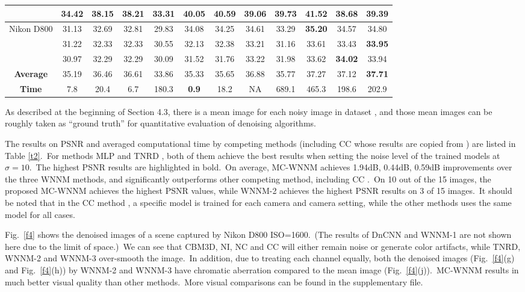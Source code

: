 \begin{table}
\begin{center}
\begin{tabular}{|c||c|c|c|c|c|c|c|c|c|c|c|}
\cline{2-12}    
& 34.42 & 38.15 & 38.21 & 33.31 & 40.05 & 40.59 & 39.06 & 39.73 & \textbf{41.52} & 38.68 & 39.39
\\ 
\hline
\multirow{3}{*}{Nikon D800} 
& 31.13 & 32.69 & 32.81 & 29.83 & 34.08 & 34.25 & 34.61 & 33.29 & \textbf{35.20} & 34.57 & 34.80
\\ 
\cline{2-12} 
\multirow{3}{*}{ISO = 6400}   
& 31.22 & 32.33 & 32.33 & 30.55 & 32.13 & 32.38  & 33.21 & 31.16 & 33.61 & 33.43 & \textbf{33.95}
\\ 
\cline{2-12}    
& 30.97 & 32.29 & 32.29 & 30.09 & 31.52 & 31.76 & 33.22 & 31.98 & 33.62 & \textbf{34.02} & 33.94
\\
\hline
\textbf{Average} 
& 35.19 & 36.46 & 36.61 & 33.86 & 35.33 & 35.65 & 36.88 & 35.77 & 37.27 & 37.12 & \textbf{ 37.71}
\\
\hline
\textbf{Time} 
& 7.8 & 20.4 & 6.7 & 180.3 & \textbf{0.9} & 18.2 & NA & 689.1 & 465.3 & 198.6 & 202.9
\\
\hline
\end{tabular}
\end{center}
\end{table}



\quad As described at the beginning of Section 4.3, there is a mean image for each noisy image in dataset \cite{crosschannel2016}, and those mean images can be roughly taken as ``ground truth'' for quantitative evaluation of denoising algorithms.

The results on PSNR and averaged computational time by competing methods (including CC \cite{crosschannel2016} whose results are copied from \cite{crosschannel2016}) are listed in Table \ref{t2}.\ For methods MLP \cite{mlp} and TNRD \cite{chen2015learning}, both of them achieve the best results when setting the noise level of the trained models at $\sigma=10$.\ The highest PSNR results are highlighted in bold.\ On average, MC-WNNM achieves 1.94dB, 0.44dB, 0.59dB improvements over the three WNNM methods, and significantly outperforms other competing method, including CC \cite{crosschannel2016}.\ On 10 out of the 15 images, the proposed MC-WNNM achieves the highest PSNR values, while WNNM-2 achieves the highest PSNR results on 3 of 15 images.\ It should be noted that in the CC method \cite{crosschannel2016}, a specific model is trained for each camera and camera setting, while the other methods uses the same model for all cases. 

Fig.\ \ref{f4} shows the denoised images of a scene captured by Nikon D800 ISO=1600.\ (The results of DnCNN and WNNM-1 are not shown here due to the limit of space.)\ We can see that CBM3D, NI, NC and CC will either remain noise or generate color artifacts, while TNRD, WNNM-2 and WNNM-3 over-smooth the image.\ In addition, due to treating each channel equally, both the denoised images (Fig.\ \ref{f4}(g) and Fig.\ \ref{f4}(h)) by WNNM-2 and WNNM-3 have chromatic aberration compared to the mean image (Fig.\ \ref{f4}(j)).\ MC-WNNM results in much better visual quality than other methods.\ More visual comparisons can be found in the supplementary file.

